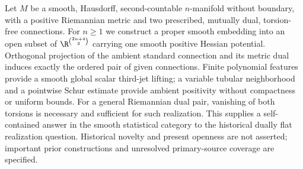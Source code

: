 Let $M$ be a smooth, Hausdorff, second-countable $n$-manifold without
boundary, with a positive Riemannian metric and two prescribed, mutually
dual, torsion-free connections. For $n\geq1$ we construct a proper smooth
embedding into an open subset of $\R^{\binom{2n+4}{3}}$ carrying one smooth
positive Hessian potential. Orthogonal projection of the ambient standard
connection and its metric dual induces exactly the ordered pair of given
connections. Finite polynomial features provide a smooth global scalar
third-jet lifting; a variable tubular neighborhood and a pointwise Schur
estimate provide ambient positivity without compactness or uniform bounds.
For a general Riemannian dual pair, vanishing of both torsions is necessary
and sufficient for such realization. This supplies a self-contained answer
in the smooth statistical category to the historical dually flat realization
question. Historical novelty and present openness are not asserted; important
prior constructions and unresolved primary-source coverage are specified.
